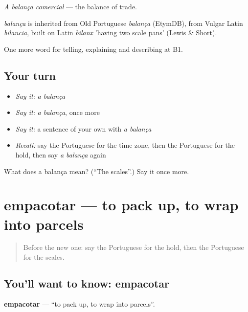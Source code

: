 \emph{A balança comercial} — the balance of trade.

\begin{cousinweb}
\emph{balança} is inherited from Old Portuguese \emph{balança} (EtymDB), from Vulgar Latin \emph{bilancia}, built on Latin \emph{bilanx} 'having two scale pans' (Lewis \& Short).
\end{cousinweb}

\begin{grammarlens}[title={What you've built}]
One more word for telling, explaining and describing at B1.
\end{grammarlens}

\subsection*{Your turn}
\begin{itemize}
\raggedright
  \item \emph{Say it:} \emph{a balança}
  \item \emph{Say it:} \emph{a balança}, once more
  \item \emph{Say it:} a sentence of your own with \emph{a balança}
  \item \emph{Recall:} say the Portuguese for the time zone, then the Portuguese for the hold, then say \emph{a balança} again
\end{itemize}

\begin{tcolorbox}[breakable,colback=teal!4,colframe=teal!35!black,title={Before you move on}]
What does a balança mean? (\textquotedblleft{}The scales\textquotedblright{}.) Say it once more.
\end{tcolorbox}
\section[empacotar]{empacotar — to pack up, to wrap into parcels}

\label{lesson:PT-C422-empacotar}



\begin{quote}
Before the new one: say the Portuguese for the hold, then the Portuguese for the scales.
\end{quote}

\subsection*{You'll want to know: empacotar}
\textbf{empacotar} — \textquotedblleft{}to pack up, to wrap into parcels\textquotedblright{}.


